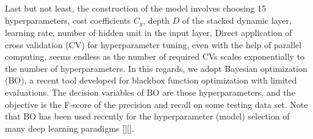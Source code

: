Last but not least, the construction of the \modelname model involves choosing 15 hyperparameters, \eg cost coefficients $C_{y}$, depth $D$ of the stacked dynamic layer, learning rate, number of hidden unit in the input layer, \etc
Direct application of cross validation (CV) for hyperparameter tuning, even with the help of parallel computing, seems endless as the number of required CVs scales exponentially to the number of hyperparameters.
In this regards, we adopt Bayesian optimization (BO), a recent tool developed for blackbox function optimization with limited evaluations.
The decision variables of BO are those hyperparameters, and the objective is the F-score of the precision and recall on some testing data set.
Note that BO has been used recently for the hyperparameter (model) selection of many deep learning paradigms [][].



